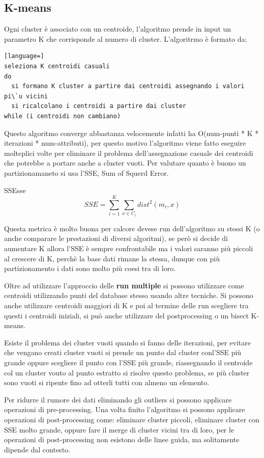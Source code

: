 \documentclass[12pt]{article}
\begin{document}
\subsection{K-means}
Ogni cluster \`e associato con un centroide, l'algoritmo prende in input un parametro K che corrisponde al numero di cluster. L'algoritrmo \`e formato da:
\begin{lstlisting}[language=]
seleziona K centroidi casuali
do
  si formano K cluster a partire dai centroidi assegnando i valori pi\`u vicini
  si ricalcolano i centroidi a partire dai cluster
while (i centroidi non cambiano)
\end{lstlisting}
Questo algoritmo converge abbastanza velocemente infatti ha O(num-punti * K * iterazioni * num-attributi), per questo motivo l'algoritmo viene fatto eseguire molteplici volte per eliminare il problema dell'assegnazione casuale dei centroidi che potrebbe a portare anche a cluster vuoti. Per valutare quanto \`e buono un partizionamaneto si usa l'SSE, Sum of Squerd Error.
\begin{definition}{SSE}{sse}
    \[ SSE = \sum_{i=1}^{K} \sum_{x \in C_i}^{} dist^{2}(m_i, x) \]
\end{definition}
Questa metrica \`e molto buona per calcore devese run dell'algoritmo su stessi K (o anche comparare le prestazioni di diversi algoritmi), se per\`o si decide di aumentare K allora l'SSE \`e sempre confrontabile ma i valori saranno pi\`u piccoli al crescere di K, perch\`e la base dati rimane la stessa, dunque con pi\`u partizionamento i dati sono molto pi\`u coesi tra di loro.

Oltre ad utilizzare l'approccio delle \textbf{run multiple} si possono utilizzare come centroidi utilizzando punti del database stesso usando altre tecniche. Si possono anche utilizzare centroidi maggiori di K e poi al termine delle run scegliere tra questi i centroidi iniziali, si pu\`o anche utilizzare del postprocessing o un bisect K-means.

Esiste il problema dei cluster vuoti quando si fanno delle iterazioni, per evitare che vengano creati cluster vuoti si prende un punto dal cluster conl'SSE pi\`u grande oppure scegliere il punto con l'SSE pi\`u grande, riassegnando il centroide col un cluster vouto al punto estratto si risolve questo problema, se pi\`u cluster sono vuoti si ripente fino ad otterli tutti con almeno un elemento.

Per ridurre il rumore dei dati eliminando gli outliers si possono applicare operazioni di pre-processing. Una volta finito l'algoritmo si possono applicare operazioni di post-processing come: eliminare cluster piccoli, eliminare cluster con SSE molto grande, oppure fare il merge di cluster vicini tra di loro, per le operazioni di post-processing non esistono delle linee guida, ma solitamente dipende dal contesto.
\end{document}
